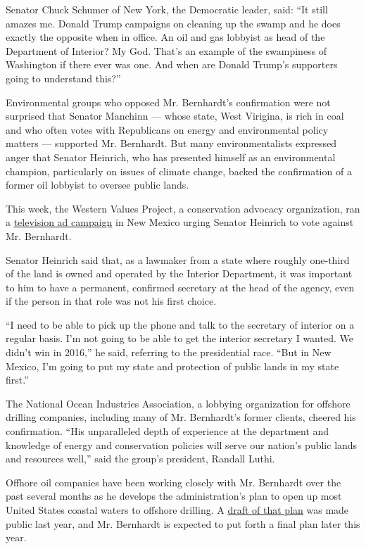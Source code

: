 Senator Chuck Schumer of New York, the Democratic leader, said: ``It
still amazes me. Donald Trump campaigns on cleaning up the swamp and he
does exactly the opposite when in office. An oil and gas lobbyist as
head of the Department of Interior? My God. That's an example of the
swampiness of Washington if there ever was one. And when are Donald
Trump's supporters going to understand this?''

Environmental groups who opposed Mr. Bernhardt's confirmation were not
surprised that Senator Manchinn --- whose state, West Virigina, is rich
in coal and who often votes with Republicans on energy and environmental
policy matters --- supported Mr. Bernhardt. But many environmentalists
expressed anger that Senator Heinrich, who has presented himself as an
environmental champion, particularly on issues of climate change, backed
the confirmation of a former oil lobbyist to oversee public lands.

This week, the Western Values Project, a conservation advocacy
organization, ran a
\href{https://www.youtube.com/watch?v=11KyUngoe_I\&feature=youtu.be}{television
ad campaign} in New Mexico urging Senator Heinrich to vote against Mr.
Bernhardt.

Senator Heinrich said that, as a lawmaker from a state where roughly
one-third of the land is owned and operated by the Interior Department,
it was important to him to have a permanent, confirmed secretary at the
head of the agency, even if the person in that role was not his first
choice.

``I need to be able to pick up the phone and talk to the secretary of
interior on a regular basis. I'm not going to be able to get the
interior secretary I wanted. We didn't win in 2016,'' he said, referring
to the presidential race. ``But in New Mexico, I'm going to put my state
and protection of public lands in my state first.''

The National Ocean Industries Association, a lobbying organization for
offshore drilling companies, including many of Mr. Bernhardt's former
clients, cheered his confirmation. ``His unparalleled depth of
experience at the department and knowledge of energy and conservation
policies will serve our nation's public lands and resources well,'' said
the group's president, Randall Luthi.

Offhore oil companies have been working closely with Mr. Bernhardt over
the past several months as he develops the administration's plan to open
up most United States coastal waters to offshore drilling. A
\href{https://www.nytimes.com/2018/01/04/climate/trump-offshore-drilling.html}{draft
of that plan} was made public last year, and Mr. Bernhardt is expected
to put forth a final plan later this year.

